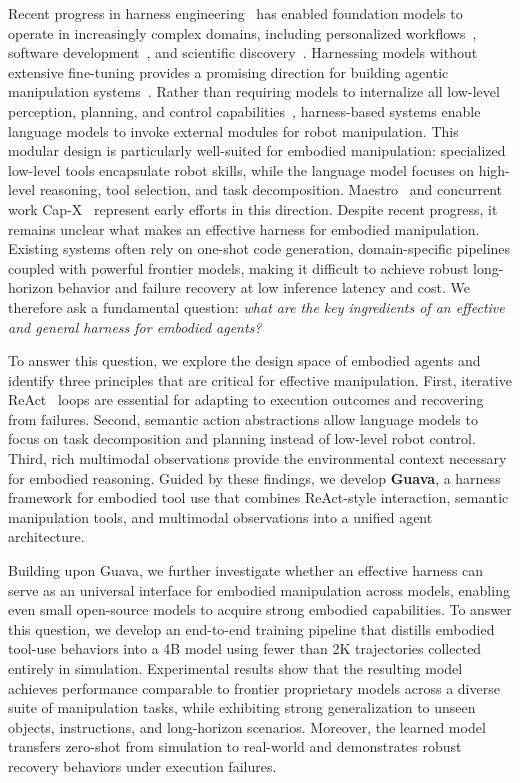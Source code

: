 \documentclass{llmxive}
\begin{document}
Recent progress in harness engineering~\citep{openai2026harness} has enabled foundation models to operate in increasingly complex domains, including personalized workflows~\citep{openclaw}, software development~\citep{anthropic_claude_code, openai_codex}, and scientific discovery~\citep{karpathy_autoresearch}. 
Harnessing models without extensive fine-tuning provides a promising direction for building agentic manipulation systems~\citep{shi2025maestro, fu2026capxframeworkbenchmarkingimproving}.
Rather than requiring models to internalize all low-level perception, planning, and control capabilities~\citep{sapkota2026visionlanguageactionvlamodelsconcepts}, harness-based systems enable language models to invoke external modules for robot manipulation. 
This modular design is particularly well-suited for embodied manipulation: specialized low-level tools encapsulate robot skills, while the language model focuses on high-level reasoning, tool selection, and task decomposition.
Maestro~\citep{shi2025maestro} and concurrent work Cap-X~\citep{fu2026capxframeworkbenchmarkingimproving} represent early efforts in this direction.
Despite recent progress, it remains unclear what makes an effective harness for embodied manipulation. Existing systems often rely on one-shot code generation, domain-specific pipelines coupled with powerful frontier models, making it difficult to achieve robust long-horizon behavior and failure recovery at low inference latency and cost. We therefore ask a fundamental question: \emph{what are the key ingredients of an effective and general harness for embodied agents?}

To answer this question, we explore the design space of embodied agents and identify three principles that are critical for effective manipulation. First, iterative ReAct~\citep{yao2023reactsynergizingreasoningacting} loops are essential for adapting to execution outcomes and recovering from failures. Second, semantic action abstractions allow language models to focus on task decomposition and planning instead of low-level robot control. Third, rich multimodal observations provide the environmental context necessary for embodied reasoning. Guided by these findings, we develop \textbf{Guava}, a harness framework for embodied tool use that combines ReAct-style interaction, semantic manipulation tools, and multimodal observations into a unified agent architecture.

Building upon Guava, we further investigate whether an effective harness can serve as an universal interface for embodied manipulation across models, enabling even small open-source models to acquire strong embodied capabilities. To answer this question, we develop an end-to-end training pipeline that distills embodied tool-use behaviors into a 4B model using fewer than 2K trajectories collected entirely in simulation. Experimental results show that the resulting model achieves performance comparable to frontier proprietary models across a diverse suite of manipulation tasks, while exhibiting strong generalization to unseen objects, instructions, and long-horizon scenarios. Moreover, the learned model transfers zero-shot from simulation to real-world and demonstrates robust recovery behaviors under execution failures.
\end{document}
